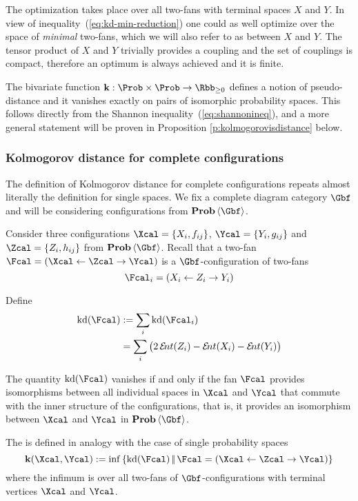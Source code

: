   The optimization takes place over all two-fans with terminal spaces
  $X$ and $Y$. In view of inequality~(\ref{eq:kd-min-reduction}) one
  could as well optimize over the space of \emph{minimal} two-fans,
  which we will also refer to as  between $X$ and $Y$. The tensor product of $X$
  and $Y$ trivially provides a coupling and the set of couplings is
  compact, therefore an optimum is always achieved and it is finite.

  The bivariate function $\ikd:\Prob\times\Prob\to\Rbb_{\geq0}$
  defines a notion of pseudo-distance and it vanishes exactly on
    pairs of isomorphic probability spaces. This follows directly
  from the Shannon inequality~(\ref{eq:shannonineq}), and a more
  general statement will be proven in Proposition
  \ref{p:kolmogorovisdistance} below.

\subsubsection{Kolmogorov distance for complete configurations}
\label{s:kolmogorov-config}
  The definition of Kolmogorov distance for complete configurations
  repeats almost literally the definition for single spaces. We fix a
  complete diagram category $\Gbf$ and will be considering configurations
  from $\prob\<\Gbf>$.
  
  Consider three configurations $\Xcal=\set{X_{i},f_{ij}}$,
  $\Ycal=\set{Y_{i},g_{ij}}$ and $\Zcal=\set{Z_{i},h_{ij}}$ from
  $\prob\<\Gbf>$. Recall that a two-fan $\Fcal=(\Xcal\ot\Zcal\to\Ycal)$ is
  a $\Gbf$-configuration of two-fans
  \[
  \Fcal_{i}=(X_{i}\ot Z_{i}\to Y_{i})
  \]
  
  Define
  \begin{align*}
    \kd(\Fcal)
    &:=
    \sum_{i} \kd(\Fcal_{i})\\
    &=
    \sum_{i}\big(2\ent(Z_{i})-\ent(X_{i})-\ent(Y_{i})\big)
  \end{align*}
  
  The quantity $\kd(\Fcal)$ vanishes if and only if the fan $\Fcal$
  provides isomorphisms between all individual spaces in $\Xcal$ and
  $\Ycal$ that commute with the inner structure of the configurations,
  that is, it provides an isomorphism between $\Xcal$ and $\Ycal$ in
  $\prob\<\Gbf>$.
  
  The  is defined in analogy
  with the case of single probability spaces
  \[
  \ikd(\Xcal,\Ycal)
  :=
  \inf\set{\kd(\Fcal) \st \Fcal=(\Xcal\ot\Zcal\to\Ycal)}
  \]
  where the infimum is over all two-fans of $\Gbf$-configurations with
  terminal vertices $\Xcal$ and $\Ycal$.
  
